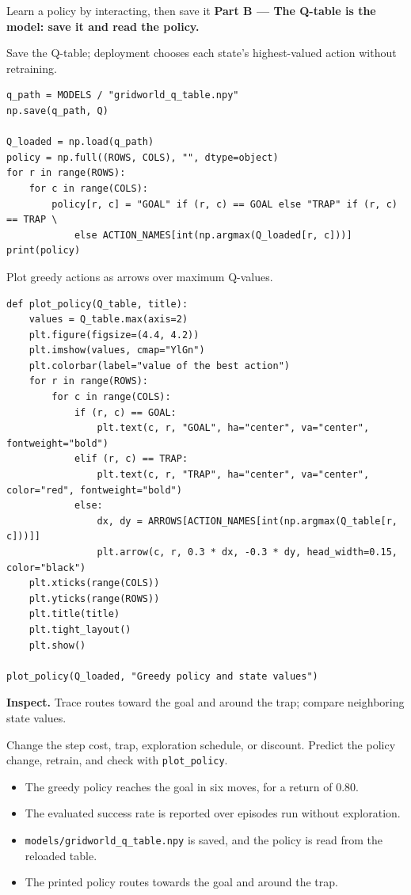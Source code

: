 \begin{labproject}{Learn a policy by interacting, then save it}
\medskip\noindent\textbf{Part B --- The Q-table is the model: save it and read the policy.}\par

Save the Q-table; deployment chooses each state’s highest-valued action without retraining.

\begin{lstlisting}[style=utppython]
q_path = MODELS / "gridworld_q_table.npy"
np.save(q_path, Q)

Q_loaded = np.load(q_path)
policy = np.full((ROWS, COLS), "", dtype=object)
for r in range(ROWS):
    for c in range(COLS):
        policy[r, c] = "GOAL" if (r, c) == GOAL else "TRAP" if (r, c) == TRAP \
            else ACTION_NAMES[int(np.argmax(Q_loaded[r, c]))]
print(policy)
\end{lstlisting}

Plot greedy actions as arrows over maximum Q-values.

\begin{lstlisting}[style=utppython]
def plot_policy(Q_table, title):
    values = Q_table.max(axis=2)
    plt.figure(figsize=(4.4, 4.2))
    plt.imshow(values, cmap="YlGn")
    plt.colorbar(label="value of the best action")
    for r in range(ROWS):
        for c in range(COLS):
            if (r, c) == GOAL:
                plt.text(c, r, "GOAL", ha="center", va="center", fontweight="bold")
            elif (r, c) == TRAP:
                plt.text(c, r, "TRAP", ha="center", va="center", color="red", fontweight="bold")
            else:
                dx, dy = ARROWS[ACTION_NAMES[int(np.argmax(Q_table[r, c]))]]
                plt.arrow(c, r, 0.3 * dx, -0.3 * dy, head_width=0.15, color="black")
    plt.xticks(range(COLS))
    plt.yticks(range(ROWS))
    plt.title(title)
    plt.tight_layout()
    plt.show()

plot_policy(Q_loaded, "Greedy policy and state values")
\end{lstlisting}

\textbf{Inspect.} Trace routes toward the goal and around the trap; compare neighboring state values.

\begin{tryit}
Change the step cost, trap, exploration schedule, or discount. Predict the policy change, retrain, and check with \texttt{plot\_policy}.
\end{tryit}
\end{labproject}

\begin{verification}
\begin{itemize}
  \item The greedy policy reaches the goal in six moves, for a return of $0.80$.
  \item The evaluated success rate is reported over episodes run without exploration.
  \item \texttt{models/gridworld\_q\_table.npy} is saved, and the policy is read from the reloaded table.
  \item The printed policy routes towards the goal and around the trap.
\end{itemize}
\end{verification}
